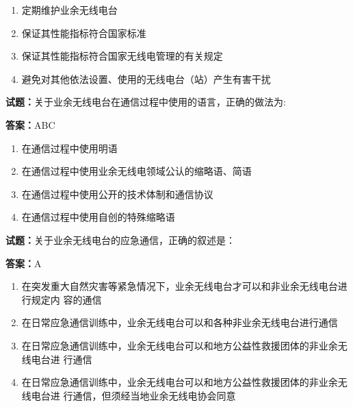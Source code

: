 \documentclass{ctexbook}
\begin{document}
\begin{enumerate}[leftmargin=3em]
  \item 定期维护业余无线电台 

  \item 保证其性能指标符合国家标准 

  \item 保证其性能指标符合国家无线电管理的有关规定 

  \item 避免对其他依法设置、使用的无线电台（站）产生有害干扰 

\end{enumerate}





\vspace{1em}

\textbf{试题：}关于业余无线电台在通信过程中使用的语言，正确的做法为: 

\textbf{答案：}ABC 

\begin{enumerate}[leftmargin=3em]
  \item 在通信过程中使用明语 

  \item 在通信过程中使用业余无线电领域公认的缩略语、简语 

  \item 在通信过程中使用公开的技术体制和通信协议 

  \item 在通信过程中使用自创的特殊缩略语 

\end{enumerate}





\vspace{1em}

\textbf{试题：}关于业余无线电台的应急通信，正确的叙述是： 

\textbf{答案：}A 

\begin{enumerate}[leftmargin=3em]
  \item 在突发重大自然灾害等紧急情况下，业余无线电台才可以和非业余无线电台进行规定内
容的通信 

  \item 在日常应急通信训练中，业余无线电台可以和各种非业余无线电台进行通信 

  \item 在日常应急通信训练中，业余无线电台可以和地方公益性救援团体的非业余无线电台进
行通信 

  \item 在日常应急通信训练中，业余无线电台可以和地方公益性救援团体的非业余无线电台进
行通信，但须经当地业余无线电协会同意 

\end{enumerate}
\end{document}

